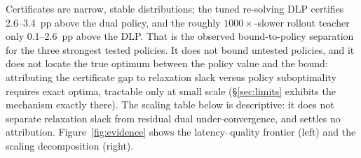 \documentclass[11pt]{article}
\begin{document}
Certificates are narrow, stable distributions; the tuned re-solving
DLP certifies 2.6--3.4~pp above the dual policy, and the
roughly $1000\times$-slower rollout teacher only 0.1--2.6~pp above
the DLP.
That is the observed bound-to-policy separation for the three
strongest tested policies. It does not bound untested policies, and it does not
locate the true optimum between the policy value and the bound:
attributing the certificate gap to relaxation slack versus policy
suboptimality requires exact optima, tractable only at
small scale (\S\ref{sec:limits} exhibits the mechanism exactly there).
The scaling table below is descriptive: it does not separate
relaxation slack from residual dual under-convergence, and settles no
attribution.
Figure~\ref{fig:evidence} shows the latency--quality frontier (left)
and the scaling decomposition (right).
\end{document}
